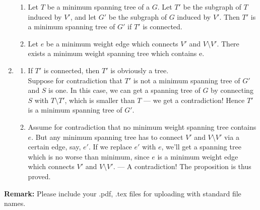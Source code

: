 \documentclass[12pt,a4paper]{article}
\makeatletter
\newtheorem*{solution}{Solution}
\theoremstyle{definition}
\renewenvironment{solution}[1][Solution] {\par\pushQED{\qed}\normalfont\topsep6\p@\@plus6\p@\relax\trivlist\item[\hskip\labelsep\bfseries#1\@addpunct{.}]\ignorespaces}{\popQED\endtrivlist\@endpefalse} \makeatother
\makeatother
\begin{document}
\begin{enumerate}
	\begin{enumerate}
		\item Let $T$ be a minimum spanning tree of a $G$. Let $T'$ be the subgraph of $T$ induced by $V'$, and let $G'$ be the subgraph of $G$ induced by $V'$. Then $T'$ is a minimum spanning tree of $G'$ if $T'$ is connected.
		\item Let $e$ be a minimum weight edge which connects $V'$ and $V \setminus V'$. There exists a minimum weight spanning tree which contains e.
	\end{enumerate}
	\begin{solution}
		\hfill
		\begin{enumerate}
			\item 
			If $T'$ is connected, then $T'$ is obviously a tree. \\ Suppose for contradiction that $T'$ is not a minimum spanning tree of $G'$ and $S$ is one. In this case, we can get a spanning tree of $G$ by connecting $S$ with $T \setminus T'$, which is smaller than $T$ --- we get a contradiction! Hence $T'$ is a minimum spanning tree of $G'$. 
			\item
			Assume for contradiction that no minimum weight spanning tree contains $e$. But any minimum spanning tree has to connect $V'$ and $V \setminus V'$ via a certain edge, say, $e'$. If we replace $e'$ with $e$, we'll get a spanning tree which is no worse than minimum, since $e$ is a minimum weight edge which connects $V'$ and $V \setminus V'$. --- A contradiction! The proposition is thus proved.
		\end{enumerate}
	\end{solution}
\end{enumerate}



\textbf{Remark:} Please include your .pdf, .tex files for uploading with standard file names.


\end{document}
